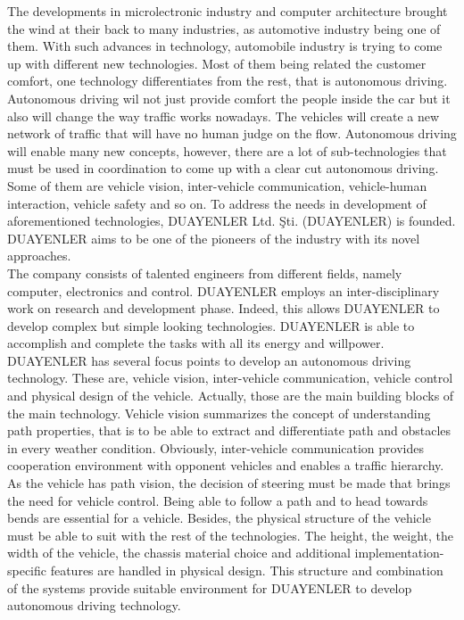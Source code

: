 \documentclass[a4paper,12pt]{article}
\begin{document}
The developments in microlectronic industry and computer architecture brought the wind at their back to many industries, as automotive industry being one of them. With such advances in technology, automobile industry is trying to come up with different new technologies. Most of them being related the customer comfort, one technology differentiates from the rest, that is autonomous driving. Autonomous driving wil not just provide comfort the people inside the car but it also will change the way traffic works nowadays. The vehicles will create a new network of traffic that will have no human judge on the flow. Autonomous driving will enable many new concepts, however, there are a lot of sub-technologies that must be used in coordination to come up with a clear cut autonomous driving. Some of them are vehicle vision, inter-vehicle communication, vehicle-human interaction, vehicle safety and so on. To address the needs in development of aforementioned technologies, DUAYENLER Ltd. Şti. (DUAYENLER) is founded. DUAYENLER aims to be one of the pioneers of the industry with its novel approaches.\\

The company consists of talented engineers from different fields, namely computer, electronics and control. DUAYENLER employs an inter-disciplinary work on research and development phase. Indeed, this allows DUAYENLER to develop complex but simple looking technologies. DUAYENLER is able to accomplish and complete the tasks with all its energy and willpower.\\

DUAYENLER has several focus points to develop an autonomous driving technology. These are, vehicle vision, inter-vehicle communication, vehicle control and physical design of the vehicle. Actually, those are the main building blocks of the main technology. Vehicle vision summarizes the concept of understanding path properties, that is to be able to extract and differentiate path and obstacles in every weather condition. Obviously, inter-vehicle communication provides cooperation environment with opponent vehicles and enables a traffic hierarchy. As the vehicle has path vision, the decision of steering must be made that brings the need for vehicle control. Being able to follow a path and to head towards bends are essential for a vehicle. Besides, the physical structure of the vehicle must be able to suit with the rest of the technologies. The height, the weight, the width of the vehicle, the chassis material choice and additional implementation-specific features are handled in physical design. This structure and combination of the systems provide suitable environment for DUAYENLER to develop autonomous driving technology.\\
\end{document}
